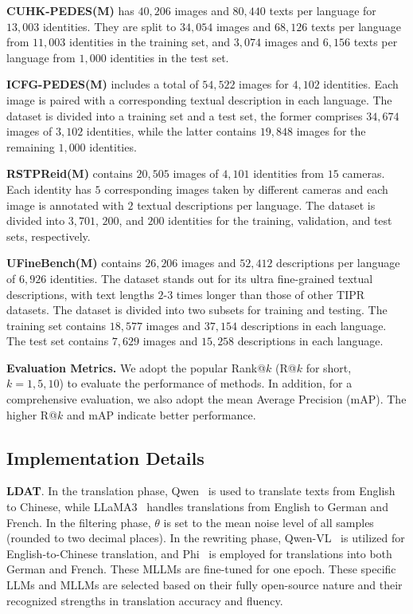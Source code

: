 \documentclass[10pt,journal,compsoc]{IEEEtran}
\begin{document}



\textbf{CUHK-PEDES(M)} has \(40,206\) images and \(80,440\) texts per language for \(13,003\) identities.
They are split to \(34, 054\) images and \(68, 126\) texts per language from \(11, 003\) identities in the training set, and \(3, 074\) images and \(6, 156\) texts per language from \(1, 000\) identities in the test set.

\textbf{ICFG-PEDES(M)} includes a total of \(54,522\) images for \(4,102\) identities. Each image is paired with a corresponding textual description in each language. The dataset is divided into a training set and a test set, the former comprises \(34,674\) images of \(3,102\) identities, while the latter contains \(19,848\) images for the remaining \(1,000\) identities.

\textbf{RSTPReid(M)} contains \(20,505\) images of \(4,101\) identities from \(15\) cameras. Each identity has \(5\) corresponding images taken by different cameras and each image is annotated with \(2\) textual descriptions per language. The dataset is divided into \(3,701\), \(200\), and \(200\) identities for the training, validation, and test sets, respectively.

\textbf{UFineBench(M)} contains \(26,206\) images and \(52,412\) descriptions per language of \(6,926\) identities. The dataset stands out for its ultra fine-grained textual descriptions, with text lengths \(2\)-\(3\) times longer than those of other TIPR datasets. The dataset is divided into two subsets for training and testing. The training set contains \(18,577\) images and \(37,154\) descriptions in each language. The test set contains \(7,629\) images and \(15,258\) descriptions in each language.

\textbf{Evaluation Metrics.} 
We adopt the popular Rank@$k$ (R@$k$ for short, $k=1,5,10$) to evaluate the performance of methods. In addition, for a comprehensive evaluation, we also adopt the mean Average Precision (mAP). The higher R@$k$ and mAP indicate better performance.

\subsection{Implementation Details}
\textbf{LDAT}. 
In the translation phase, Qwen~\cite{bai2023qwen} is used to translate texts from English to Chinese, while LLaMA3~\cite{dubey2024llama} handles translations from English to German and French. 
In the filtering phase, \(\theta\) is set to the mean noise level of all samples (rounded to two decimal places). In the rewriting phase, Qwen-VL~\cite{bai2023qwenvl} is utilized for English-to-Chinese translation, and Phi~\cite{abdin2024phi} is employed for translations into both German and French. These MLLMs are fine-tuned for one epoch. These specific LLMs and MLLMs are selected based on their fully open-source nature and their recognized strengths in translation accuracy and fluency.
\end{document}
